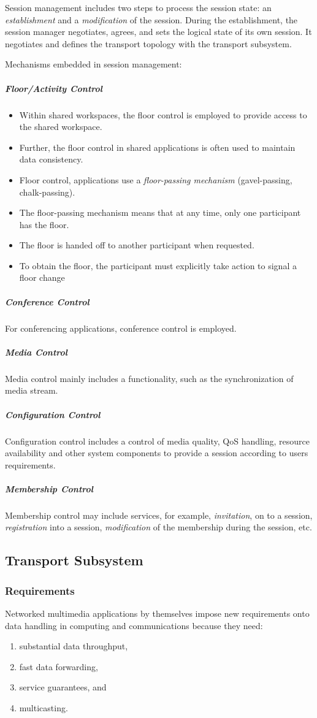 Session management includes two steps to process the session state: an \textit{establishment}
and a \textit{modification} of the session. During the establishment, the session manager
negotiates, agrees, and sets the logical state of its own session. It negotiates and defines the transport topology with the transport subsystem. 

Mechanisms embedded in session management:

\subparagraph{Floor/Activity Control}
		\begin{itemize}
	\item Within shared workspaces, the floor control is employed to provide access to
	the shared workspace.
	\item Further, the floor control in shared applications is often used to maintain data consistency.
	\item Floor control, applications use a \textit{floor-passing mechanism} (gavel-passing, chalk-passing).
	\item The floor-passing mechanism means that at any time, only one
	participant has the floor. 
	\item The floor is handed off to another participant when
	requested. 
	\item To obtain the floor, the participant must explicitly take action to
	signal a floor change
\end{itemize}

\subparagraph{{Conference Control}}
For conferencing applications, conference control is employed.
	 
\subparagraph{{Media Control}}	 
Media control mainly includes a functionality, such as the synchronization of media stream.

\subparagraph{{Configuration Control}}
Configuration control includes a control of media quality, QoS handling, resource availability and other system components to provide a session according to users requirements.

\subparagraph{{Membership Control}}
Membership control may include services, for example, \textit{invitation}, on to a session, \textit{registration} into a session, \textit{modification} of the membership during the session,
etc.

\subsection{Transport Subsystem}
\subsubsection{Requirements}
Networked multimedia applications by themselves impose new requirements onto data handling in computing and communications because they need:
\begin{multicols}{2}
\begin{enumerate}
	 \item substantial data throughput,  
	 \item fast data forwarding,  
	 \item service guarantees, and 
	 \item multicasting.
\end{enumerate}
\end{multicols}


